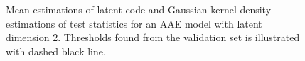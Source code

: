 \documentclass[journal, peerreview]{IEEEtran}
\begin{document}
\begin{figure}[!t]
	\centering
	\null\hfill
	\hfill	
	\hfill\null
	
	\null\hfill
	\hfill
	\hfill\null
	
	\caption{Mean estimations of latent code and Gaussian kernel density estimations of test statistics for an AAE model with latent dimension 2. Thresholds found from the validation set is illustrated with dashed black line.}
	\label{fig:T2vsQ}
\end{figure}
\end{document}
